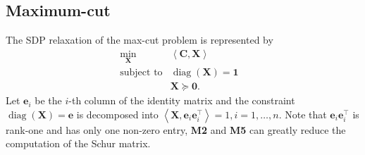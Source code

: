 \documentclass[10pt]{article}
\begin{document}
{\subsection{Maximum-cut}

The SDP relaxation of the max-cut problem is represented by
\begin{eqnarray*}
  \min_{\mathbf{X}} & \left\langle \mathbf{C}, \mathbf{X} \right\rangle & \\
  \text{subject to} & \ensuremath{\operatorname{diag}} \left( \mathbf{X} \right) = \textbf{1} & \\
  & \mathbf{X} \succeq \textbf{0} . & 
\end{eqnarray*}
Let $\mathbf{e}_i$ be the $i$-th column of the identity matrix and the constraint
$\ensuremath{\operatorname{diag}} \left( \mathbf{X} \right) = \mathbf{e}$ is decomposed into $\left\langle \mathbf{X}, \mathbf{e}_i
\mathbf{e}_i^{\top} \right\rangle = 1, i = 1, \ldots, n$. Note that $\mathbf{e}_i \mathbf{e}_i^{\top}$
is rank-one and has only one non-zero entry, {\textbf{M2}} and
{\textbf{M5}} can greatly reduce the computation of the Schur matrix.

}
\end{document}
